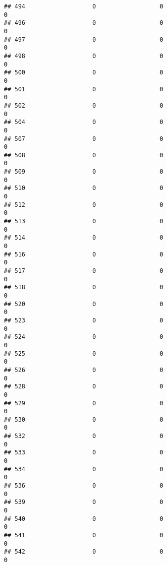 \documentclass[
]{article}
\begin{document}
\begin{verbatim}
## 494                   0                  0                              0
## 496                   0                  0                              0
## 497                   0                  0                              0
## 498                   0                  0                              0
## 500                   0                  0                              0
## 501                   0                  0                              0
## 502                   0                  0                              0
## 504                   0                  0                              0
## 507                   0                  0                              0
## 508                   0                  0                              0
## 509                   0                  0                              0
## 510                   0                  0                              0
## 512                   0                  0                              0
## 513                   0                  0                              0
## 514                   0                  0                              0
## 516                   0                  0                              0
## 517                   0                  0                              0
## 518                   0                  0                              0
## 520                   0                  0                              0
## 523                   0                  0                              0
## 524                   0                  0                              0
## 525                   0                  0                              0
## 526                   0                  0                              0
## 528                   0                  0                              0
## 529                   0                  0                              0
## 530                   0                  0                              0
## 532                   0                  0                              0
## 533                   0                  0                              0
## 534                   0                  0                              0
## 536                   0                  0                              0
## 539                   0                  0                              0
## 540                   0                  0                              0
## 541                   0                  0                              0
## 542                   0                  0                              0

\end{verbatim}
\end{document}

